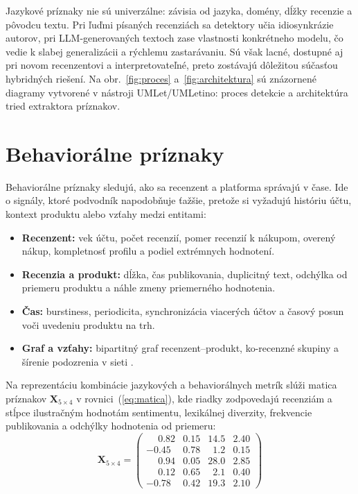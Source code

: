 \documentclass[10pt,twocolumn,twoside,slovak,a4paper]{article}
\begin{document}
Jazykové príznaky nie sú univerzálne: závisia od jazyka, domény, dĺžky recenzie a pôvodcu textu. Pri ľuďmi písaných recenziách sa detektory učia idiosynkrázie autorov, pri LLM-generovaných textoch zase vlastnosti konkrétneho modelu, čo vedie k slabej generalizácii a rýchlemu zastarávaniu. Sú však lacné, dostupné aj pri novom recenzentovi a interpretovateľné, preto zostávajú dôležitou súčasťou hybridných riešení. Na obr.~\ref{fig:proces} a~\ref{fig:architektura} sú znázornené diagramy vytvorené v nástroji UMLet/UMLetino: proces detekcie a architektúra tried extraktora príznakov.


\section{Behaviorálne príznaky} \label{behavioralne}

Behaviorálne príznaky sledujú, ako sa recenzent a platforma správajú v čase. Ide o signály, ktoré podvodník napodobňuje ťažšie, pretože si vyžadujú históriu účtu, kontext produktu alebo vzťahy medzi entitami:

\begin{itemize}
  \item \textbf{Recenzent:} vek účtu, počet recenzií, pomer recenzií k nákupom, overený nákup, kompletnosť profilu a podiel extrémnych hodnotení.
  \item \textbf{Recenzia a produkt:} dĺžka, čas publikovania, duplicitný text, odchýlka od priemeru produktu a náhle zmeny priemerného hodnotenia.
  \item \textbf{Čas:} burstiness, periodicita, synchronizácia viacerých účtov a časový posun voči uvedeniu produktu na trh.
  \item \textbf{Graf a vzťahy:} bipartitný graf recenzent--produkt, ko-recenzné skupiny a šírenie podozrenia v sieti \cite{mukherjee2012,rayana2015}.
\end{itemize}

Na reprezentáciu kombinácie jazykových a behaviorálnych metrík slúži matica príznakov $\mathbf{X}_{5\times 4}$ v rovnici~(\ref{eq:matica}), kde riadky zodpovedajú recenziám a stĺpce ilustračným hodnotám sentimentu, lexikálnej diverzity, frekvencie publikovania a odchýlky hodnotenia od priemeru:
\begin{equation}
\mathbf{X}_{5\times 4} =
\begin{pmatrix}
\phantom{-}0.82 & 0.15 & 14.5 & 2.40 \\
-0.45 & 0.78 & \phantom{0}1.2 & 0.15 \\
\phantom{-}0.94 & 0.05 & 28.0 & 2.85 \\
\phantom{-}0.12 & 0.65 & \phantom{0}2.1 & 0.40 \\
-0.78 & 0.42 & 19.3 & 2.10
\end{pmatrix}
\label{eq:matica}
\end{equation}
\end{document}

